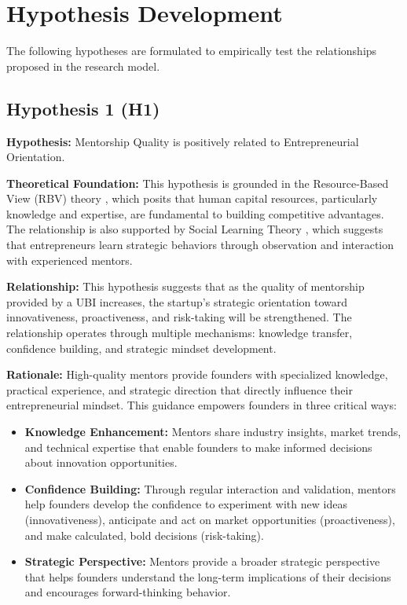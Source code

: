\documentclass[../Main.tex]{subfiles}
\begin{document}
    \section{Hypothesis Development}
    The following hypotheses are formulated to empirically test the relationships proposed in the research model.

    \subsection{Hypothesis 1 (H1)}
    \textbf{Hypothesis:} Mentorship Quality is positively related to Entrepreneurial Orientation.
    
    \textbf{Theoretical Foundation:} This hypothesis is grounded in the Resource-Based View (RBV) theory \cite{barney1991firm}, which posits that human capital resources, particularly knowledge and expertise, are fundamental to building competitive advantages. The relationship is also supported by Social Learning Theory \cite{bandura1997self}, which suggests that entrepreneurs learn strategic behaviors through observation and interaction with experienced mentors.
    
    \textbf{Relationship:} This hypothesis suggests that as the quality of mentorship provided by a UBI increases, the startup's strategic orientation toward innovativeness, proactiveness, and risk-taking will be strengthened. The relationship operates through multiple mechanisms: knowledge transfer, confidence building, and strategic mindset development.
    
    \textbf{Rationale:} High-quality mentors provide founders with specialized knowledge, practical experience, and strategic direction that directly influence their entrepreneurial mindset. This guidance empowers founders in three critical ways:
    \begin{itemize}
        \item \textbf{Knowledge Enhancement:} Mentors share industry insights, market trends, and technical expertise that enable founders to make informed decisions about innovation opportunities.
        \item \textbf{Confidence Building:} Through regular interaction and validation, mentors help founders develop the confidence to experiment with new ideas (innovativeness), anticipate and act on market opportunities (proactiveness), and make calculated, bold decisions (risk-taking).
        \item \textbf{Strategic Perspective:} Mentors provide a broader strategic perspective that helps founders understand the long-term implications of their decisions and encourages forward-thinking behavior.
    \end{itemize}
    
\end{document}

